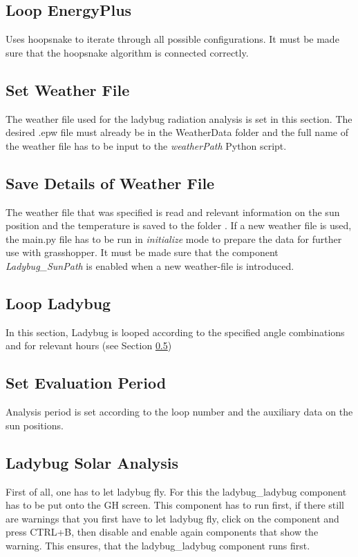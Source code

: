 	\subsection{Loop EnergyPlus}
	Uses hoopsnake to iterate through all possible configurations. It must be made sure that the hoopsnake algorithm is connected correctly.

	\subsection{Set Weather File}
	The weather file used for the ladybug radiation analysis is set in this section. The desired .epw file must already be in the WeatherData folder and the full name of the weather file has to be input to the \emph{weatherPath} Python script. 

	\subsection{Save Details of Weather File}
	The weather file that was specified is read and relevant information on the sun position and the temperature is saved to the folder . If a new weather file is used, the main.py file has to be run in \emph{initialize} mode to prepare the data for further use with grasshopper. It must be made sure that the component \emph{Ladybug\_SunPath} is enabled when a new weather-file is introduced. 


	\subsection{Loop Ladybug}
	In this section, Ladybug is looped according to the specified angle combinations and for relevant hours (see Section \ref{ss:setEvalPeriod})

	\subsection{Set Evaluation Period}
	\label{ss:setEvalPeriod}
	Analysis period is set according to the loop number and the auxiliary data on the sun positions. 

	\subsection{Ladybug Solar Analysis}
	First of all, one has to let ladybug fly. For this the ladybug\_ladybug component has to be put onto the GH screen. This component has to run first, if there still are warnings that you first have to let ladybug fly, click on the component and press CTRL+B, then disable and enable again components that show the warning. This ensures, that the ladybug\_ladybug component runs first. 

